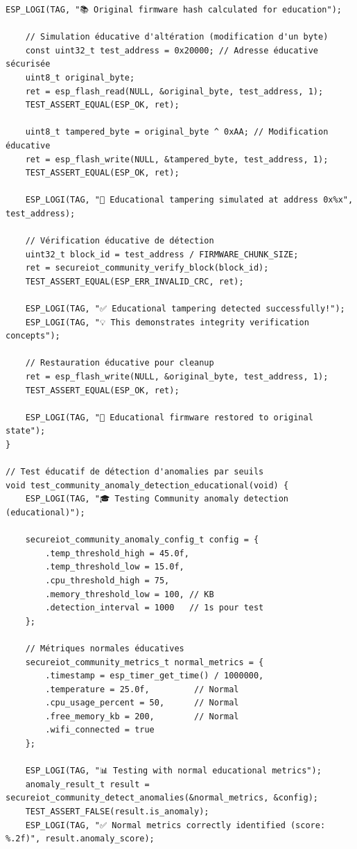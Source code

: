 \begin{lstlisting}[caption={Framework de test éducatif Community}]
    ESP_LOGI(TAG, "📚 Original firmware hash calculated for education");
    
    // Simulation éducative d'altération (modification d'un byte)
    const uint32_t test_address = 0x20000; // Adresse éducative sécurisée
    uint8_t original_byte;
    ret = esp_flash_read(NULL, &original_byte, test_address, 1);
    TEST_ASSERT_EQUAL(ESP_OK, ret);
    
    uint8_t tampered_byte = original_byte ^ 0xAA; // Modification éducative
    ret = esp_flash_write(NULL, &tampered_byte, test_address, 1);
    TEST_ASSERT_EQUAL(ESP_OK, ret);
    
    ESP_LOGI(TAG, "🔧 Educational tampering simulated at address 0x%x", test_address);
    
    // Vérification éducative de détection
    uint32_t block_id = test_address / FIRMWARE_CHUNK_SIZE;
    ret = secureiot_community_verify_block(block_id);
    TEST_ASSERT_EQUAL(ESP_ERR_INVALID_CRC, ret);
    
    ESP_LOGI(TAG, "✅ Educational tampering detected successfully!");
    ESP_LOGI(TAG, "💡 This demonstrates integrity verification concepts");
    
    // Restauration éducative pour cleanup
    ret = esp_flash_write(NULL, &original_byte, test_address, 1);
    TEST_ASSERT_EQUAL(ESP_OK, ret);
    
    ESP_LOGI(TAG, "🔄 Educational firmware restored to original state");
}

// Test éducatif de détection d'anomalies par seuils
void test_community_anomaly_detection_educational(void) {
    ESP_LOGI(TAG, "🎓 Testing Community anomaly detection (educational)");
    
    secureiot_community_anomaly_config_t config = {
        .temp_threshold_high = 45.0f,
        .temp_threshold_low = 15.0f,
        .cpu_threshold_high = 75,
        .memory_threshold_low = 100, // KB
        .detection_interval = 1000   // 1s pour test
    };
    
    // Métriques normales éducatives
    secureiot_community_metrics_t normal_metrics = {
        .timestamp = esp_timer_get_time() / 1000000,
        .temperature = 25.0f,         // Normal
        .cpu_usage_percent = 50,      // Normal
        .free_memory_kb = 200,        // Normal
        .wifi_connected = true
    };
    
    ESP_LOGI(TAG, "📊 Testing with normal educational metrics");
    anomaly_result_t result = secureiot_community_detect_anomalies(&normal_metrics, &config);
    TEST_ASSERT_FALSE(result.is_anomaly);
    ESP_LOGI(TAG, "✅ Normal metrics correctly identified (score: %.2f)", result.anomaly_score);
    

\end{lstlisting}
